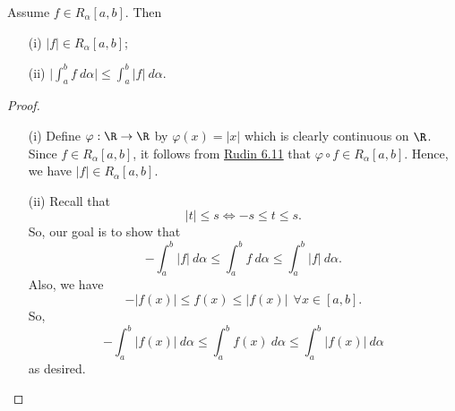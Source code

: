 \begin{theorem}
    Assume \( f \in {R}_{\alpha}[a,b] \). Then
    \begin{enumerate}
        \item[(i)] \( | f |  \in {R}_{\alpha}[a,b] \);
        \item[(ii)] \( \displaystyle \Big| \int_{ a }^{ b }  f  \ d \alpha \Big|  \leq \int_{ a }^{ b }  | f |  \ d \alpha \).
    \end{enumerate}
\end{theorem}
\begin{proof}
\begin{enumerate}
    \item[(i)] Define \( \varphi: \R \to \R  \) by \( \varphi(x) = | x  |  \) which is clearly continuous on \( \R  \). Since \( f \in {R}_{\alpha}[a,b] \), it follows from {\hyperref[Rudin 6.11]{Rudin 6.11}} that \( \varphi \circ f \in {R}_{\alpha}[a,b] \). Hence, we have \( | f |  \in {R}_{\alpha}[a,b]  \).  
    \item[(ii)] Recall that 
        \[  | t  |  \leq s \iff - s \leq t \leq s.  \]
        So, our goal is to show that 
        \[ - \int_{ a }^{ b }  | f  |  \ d \alpha \leq \int_{ a }^{ b }  f  \ d \alpha \leq \int_{ a }^{ b }  | f  |  \ d \alpha. \]
        Also, we have 
        \[ - | f(x) |  \leq f(x) \leq | f(x) |  \ \ \forall x \in [a,b].  \]
        So, 
        \[  -\int_{ a }^{ b }  | f(x) |  \ d \alpha \leq \int_{ a }^{ b }  f(x) \ d \alpha \leq \int_{ a }^{ b }  | f(x) |  \ d \alpha \]
        as desired.
\end{enumerate}
\end{proof}



